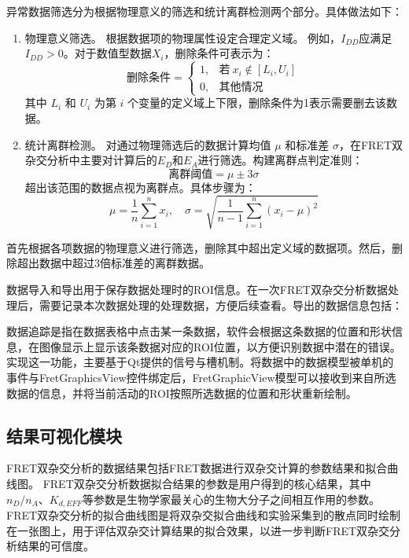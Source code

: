 异常数据筛选分为根据物理意义的筛选和统计离群检测两个部分。具体做法如下：
\begin{enumerate}
  \item 物理意义筛选。
  根据数据项的物理属性设定合理定义域。
  例如，$I_{DD}$应满足 $I_{DD} > 0$。对于数值型数据$X_i$，删除条件可表示为：
  \begin{equation}
    \text{删除条件} = 
      \begin{cases} 
        1, & \text{若} \ x_i \notin [L_i, U_i] \\
        0, & \text{其他情况}
      \end{cases}
  \end{equation}
  其中 $L_i$ 和 $U_i$ 为第 $i$ 个变量的定义域上下限，删除条件为1表示需要删去该数据。
  \item 统计离群检测。
  对通过物理筛选后的数据计算均值 $\mu$ 和标准差 $\sigma$，在FRET双杂交分析中主要对计算后的$E_D$和$E_A$进行筛选。构建离群点判定准则：
  \begin{equation}
      \text{离群阈值} = \mu \pm 3\sigma
  \end{equation}
  超出该范围的数据点视为离群点。具体步骤为：
  \begin{equation}
          \mu = \frac{1}{n}\sum_{i=1}^n x_i, \quad \sigma = \sqrt{\frac{1}{n-1}\sum_{i=1}^n (x_i - \mu)^2}
  \end{equation}
  

\end{enumerate}
首先根据各项数据的物理意义进行筛选，删除其中超出定义域的数据项。然后，删除超出数据中超过3倍标准差的离群数据。

数据导入和导出用于保存数据处理时的ROI信息。在一次FRET双杂交分析数据处理后，需要记录本次数据处理的处理数据，方便后续查看。导出的数据信息包括：

数据追踪是指在数据表格中点击某一条数据，软件会根据这条数据的位置和形状信息，在图像显示上显示该条数据对应的ROI位置，以方便识别数据中潜在的错误。实现这一功能，主要基于Qt提供的信号与槽机制。将数据中的数据模型被单机的事件与FretGraphicsView控件绑定后，FretGraphicView模型可以接收到来自所选数据的信息，并将当前活动的ROI按照所选数据的位置和形状重新绘制。

\subsection{结果可视化模块}
\ifshowtext
FRET双杂交分析的数据结果包括FRET数据进行双杂交计算的参数结果和拟合曲线图。
FRET双杂交分析数据拟合结果的参数是用户得到的核心结果，其中$n_D/n_A$、$K_{d,EFF}$等参数是生物学家最关心的生物大分子之间相互作用的参数。
FRET双杂交分析的拟合曲线图是将双杂交拟合曲线和实验采集到的散点同时绘制在一张图上，用于评估双杂交计算结果的拟合效果，以进一步判断FRET双杂交分析结果的可信度。

